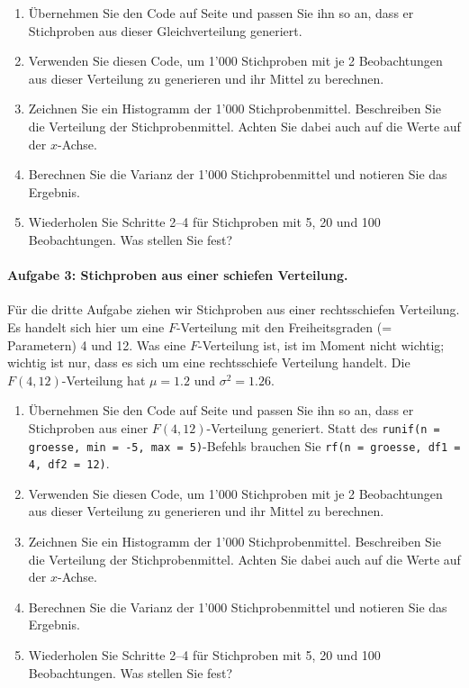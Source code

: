 \documentclass[oneside, 10pt]{book}\usepackage[]{graphicx}\usepackage[]{xcolor}
\begin{document}
\begin{enumerate}
\item Übernehmen Sie den Code auf Seite \pageref{code:stichprobenmittel}
und passen Sie ihn so an, dass er Stichproben aus dieser
Gleichverteilung generiert.

\item Verwenden Sie diesen Code, um 1'000 Stichproben mit je
2 Beobachtungen aus dieser Verteilung zu generieren und ihr Mittel
zu berechnen.

\item Zeichnen Sie ein Histogramm der 1'000 Stichprobenmittel.
Beschreiben Sie die Verteilung der Stichprobenmittel.
Achten Sie dabei auch auf die Werte auf der $x$-Achse.

\item Berechnen Sie die Varianz der 1'000 Stichprobenmittel und notieren
Sie das Ergebnis.

\item Wiederholen Sie Schritte 2--4 für Stichproben mit
5, 20 und 100 Beobachtungen. Was stellen Sie fest?
\end{enumerate}


\paragraph{Aufgabe 3: Stichproben aus einer schiefen Verteilung.}
Für die dritte Aufgabe ziehen wir Stichproben aus einer
rechtsschiefen Verteilung. Es handelt sich hier um eine
$F$-Verteilung mit den Freiheitsgraden (= Parametern) 4 und 12.
Was eine $F$-Verteilung ist, ist im Moment nicht wichtig; wichtig
ist nur, dass es sich um eine rechtsschiefe Verteilung handelt.
Die $F(4, 12)$-Verteilung hat
$\mu = 1.2$ und $\sigma^2 = 1.26$.

\begin{enumerate}
\item Übernehmen Sie den Code auf Seite \pageref{code:stichprobenmittel}
und passen Sie ihn so an, dass er Stichproben aus einer $F(4, 12)$-Verteilung
generiert.
Statt des \texttt{runif(n = groesse, min = -5, max = 5)}-Befehls
brauchen Sie \texttt{rf(n = groesse, df1 = 4, df2 = 12)}.

\item Verwenden Sie diesen Code, um 1'000 Stichproben mit je
2 Beobachtungen aus dieser Verteilung zu generieren und ihr Mittel
zu berechnen.

\item Zeichnen Sie ein Histogramm der 1'000 Stichprobenmittel.
Beschreiben Sie die Verteilung der Stichprobenmittel.
Achten Sie dabei auch auf die Werte auf der $x$-Achse.

\item Berechnen Sie die Varianz der 1'000 Stichprobenmittel und notieren
Sie das Ergebnis.

\item Wiederholen Sie Schritte 2--4 für Stichproben mit
5, 20 und 100 Beobachtungen. Was stellen Sie fest?
\end{enumerate}
\end{document}
